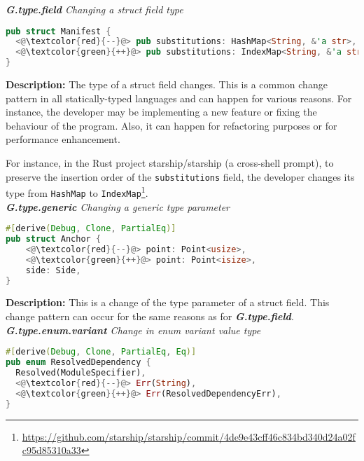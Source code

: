 \noindent\textit{\label{sec:G.type.field}\textbf{G.type.field} Changing a struct field type}

\begin{lstlisting}[language=Rust, style=colouredRust]
pub struct Manifest {
  <@\textcolor{red}{--}@> pub substitutions: HashMap<String, &'a str>,
  <@\textcolor{green}{++}@> pub substitutions: IndexMap<String, &'a str>,
}

\end{lstlisting}

\noindent\textbf{Description:} The type of a struct field changes. This is a common change pattern in all statically-typed languages and can happen for various reasons. For instance, the developer may be implementing a new feature or fixing the behaviour of the program. Also, it can happen for refactoring purposes or for performance enhancement. 

For instance, in the Rust project starship/starship (a cross-shell prompt), to preserve the insertion order of the \verb+substitutions+ field, the developer changes its type from \verb+HashMap+ to \verb+IndexMap+\footnote{\url{https://github.com/starship/starship/commit/4de9e43cff46c834bd340d24a02fc95d85310a33}}.
\\

\noindent\textit{\textbf{G.type.generic} Changing a generic type parameter}

\begin{lstlisting}[language=Rust, style=colouredRust]
#[derive(Debug, Clone, PartialEq)]
pub struct Anchor {
    <@\textcolor{red}{--}@> point: Point<usize>,
    <@\textcolor{green}{++}@> point: Point<isize>,
    side: Side,
}

\end{lstlisting}

\noindent\textbf{Description:} This is a change of the type parameter of a struct field. This change pattern can occur for the same reasons as for \textit{\textbf{G.type.field}}. \\

\noindent\textit{\textbf{G.type.enum.variant} Change in enum variant value type}

\begin{lstlisting}[language=Rust, style=colouredRust]
#[derive(Debug, Clone, PartialEq, Eq)]
pub enum ResolvedDependency {
  Resolved(ModuleSpecifier),
  <@\textcolor{red}{--}@> Err(String),
  <@\textcolor{green}{++}@> Err(ResolvedDependencyErr),
}

\end{lstlisting}

